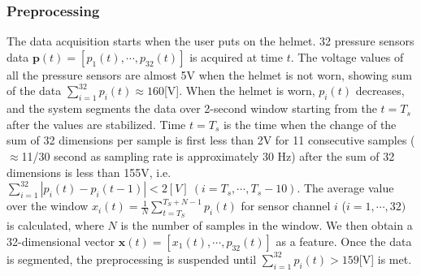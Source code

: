 \documentclass[sigchi,authordraft]{acmart}
\begin{document}
\subsubsection{Preprocessing}
The data acquisition starts when the user puts on the helmet. 32 pressure sensors data $\bm{p}(t)=[p_1(t),\cdots,p_{32}(t)]$ is acquired at time $t$. The voltage values of all the pressure sensors are almost 5V when the helmet is not worn, showing sum of the data $\sum_{i=1}^{32}p_i(t)\approx 160$[V]. When the helmet is worn, $p_i(t)$ decreases, and the system segments the data over 2-second window starting from the $t=T_s$ after the values are stabilized. Time $t=T_s$ is the time when the change of the sum of 32 dimensions per sample is first less than 2V for 11 consecutive samples ($\approx$11/30 second as sampling rate is approximately 30 Hz) after the sum of 32 dimensions is less than 155V, i.e. $\sum_{i=1}^{32}|p_i(t)-p_i(t-1)|<2[V]~(i=T_s,\cdots,T_s-10)$. The average value over the window $x_i(t)=\frac{1}{N}\sum_{t=T_S}^{T_S+N-1}p_i(t)$ for sensor channel $i$ ($i=1,\cdots,32)$ is calculated, where $N$ is the number of samples in the window. We then obtain a 32-dimensional vector $\bm{x}(t)=[x_{1}(t),\cdots,p_{32}(t)]$ as a feature. Once the data is segmented, the preprocessing is suspended until $\sum_{i=1}^{32}p_i(t)>159$[V] is met.



\end{document}

